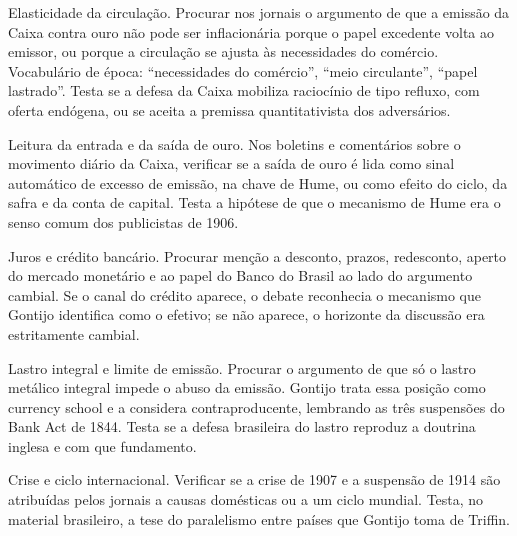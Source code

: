 \begin{dialogo}
\item Elasticidade da circulação. Procurar nos jornais o argumento de que a
emissão da Caixa contra ouro não pode ser inflacionária porque o papel excedente
volta ao emissor, ou porque a circulação se ajusta às necessidades do comércio.
Vocabulário de época: ``necessidades do comércio'', ``meio circulante'', ``papel
lastrado''. Testa se a defesa da Caixa mobiliza raciocínio de tipo refluxo, com
oferta endógena, ou se aceita a premissa quantitativista dos adversários.

\item Leitura da entrada e da saída de ouro. Nos boletins e comentários sobre o
movimento diário da Caixa, verificar se a saída de ouro é lida como sinal
automático de excesso de emissão, na chave de Hume, ou como efeito do ciclo, da
safra e da conta de capital. Testa a hipótese de que o mecanismo de Hume era o
senso comum dos publicistas de 1906.

\item Juros e crédito bancário. Procurar menção a desconto, prazos, redesconto,
aperto do mercado monetário e ao papel do Banco do Brasil ao lado do argumento
cambial. Se o canal do crédito aparece, o debate reconhecia o mecanismo que
Gontijo identifica como o efetivo; se não aparece, o horizonte da discussão era
estritamente cambial.

\item Lastro integral e limite de emissão. Procurar o argumento de que só o
lastro metálico integral impede o abuso da emissão. Gontijo trata essa posição
como currency school e a considera contraproducente, lembrando as três suspensões
do Bank Act de 1844. Testa se a defesa brasileira do lastro reproduz a doutrina
inglesa e com que fundamento.

\item Crise e ciclo internacional. Verificar se a crise de 1907 e a suspensão de
1914 são atribuídas pelos jornais a causas domésticas ou a um ciclo mundial.
Testa, no material brasileiro, a tese do paralelismo entre países que Gontijo
toma de Triffin.
\end{dialogo}

